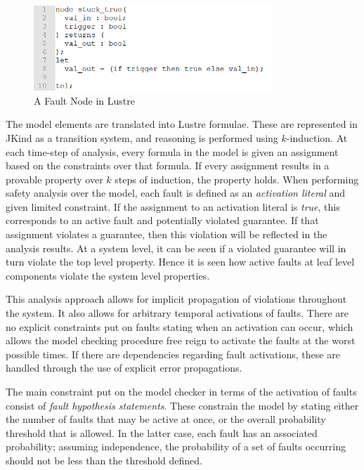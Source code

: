 \begin{figure}[h]
	\begin{center}
		\includegraphics[width=0.8\textwidth]{images/lustreFaultNode.png}
	\end{center}
	\caption{A Fault Node in Lustre}
	\label{fig:lustreFaultNode}
\end{figure}
 
The model elements are translated into Lustre formulae. These are represented in JKind as a transition system, and reasoning is performed using $k$-induction. At each time-step of analysis, every formula in the model is given an assignment based on the constraints over that formula. If every assignment results in a provable property over $k$ steps of induction, the property holds. When performing safety analysis over the model, each fault is defined as an {\em activation literal} and given limited constraint. If the assignment to an activation literal is {\em true}, this corresponds to an active fault and potentially violated guarantee. If that assignment violates a guarantee, then this violation will be reflected in the analysis results. At a system level, it can be seen if a violated guarantee will in turn violate the top level property. Hence it is seen how active faults at leaf level components violate the system level properties. 

This analysis approach allows for implicit propagation of violations throughout the system. It also allows for arbitrary temporal activations of faults. There are no explicit constraints put on faults stating when an activation can occur, which allows the model checking procedure free reign to activate the faults at the worst possible times. If there are dependencies regarding fault activations, these are handled through the use of explicit error propagations.

The main constraint put on the model checker in terms of the activation of faults consist of {\em fault hypothesis statements}. These constrain the model by stating either the number of faults that may be active at once, or the overall probability threshold that is allowed. In the latter case, each fault has an associated probability; assuming independence, the probability of a set of faults occurring should not be less than the threshold defined. 

